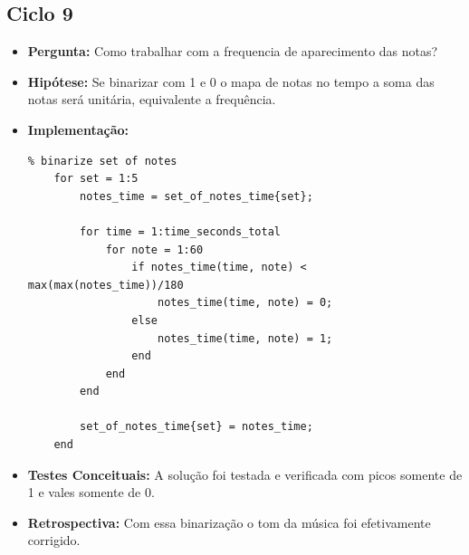 \subsection{Ciclo 9}
\label{subsec:ciclo_9}
\begin{itemize}
\item \textbf{Pergunta:} Como trabalhar com a frequencia de aparecimento das notas?
\item \textbf{Hipótese:} Se binarizar com 1 e 0 o mapa de notas no tempo a soma das notas será unitária, equivalente a frequência.
\item \textbf{Implementação:} 
\begin{lstlisting}
% binarize set of notes
    for set = 1:5
        notes_time = set_of_notes_time{set};
        
        for time = 1:time_seconds_total
            for note = 1:60
                if notes_time(time, note) < max(max(notes_time))/180
                    notes_time(time, note) = 0;
                else
                    notes_time(time, note) = 1;
                end
            end
        end

        set_of_notes_time{set} = notes_time;
    end
\end{lstlisting}
\item \textbf{Testes Conceituais:} A solução foi testada e verificada com picos somente de 1 e vales somente de 0. 
\item \textbf{Retrospectiva:} Com essa binarização o tom da música foi efetivamente corrigido.
\end{itemize}

